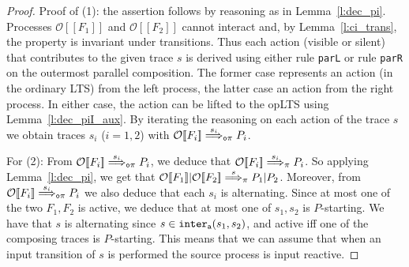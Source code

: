 \documentclass[11pt,a4paper]{amsart}
\theoremstyle{plain}
\theoremstyle{definition}
\theoremstyle{defC}
\theoremstyle{thmC}
\theoremstyle{plain}
\numberwithin{equation}{section}
\def\finish#1{\vskip.2cm\noindent{\em #1}%
  \marginpar{$\longleftarrow$}\vskip.2cm}
\newcommand{\finish}[1]{}
\newcommand{\tr}{s}
\newcommand{\trans}[1]{\mbox{{\tt #1}}}
\newcommand{\rmm}[1]{{\tt{\lowercase{#1}}}}
\newcommand{\genArr}[2]{\mathrel{\stackrel{{#1}}{\Longrightarrow}_{\rmm{\lowercase{#2}}}}}  %
\newcommand{\ArrPI}[1]{\genArr{#1}{\pi}}   %
\newcommand{\ArrN}[1]{\genArr{#1}{o\pi}}  %
\newcommand{\opLTS}{opLTS\xspace}  %
\newcommand{\interlA}[2]{{\tt inter_{a}}( #1, #2)}
\newcommand{\FF}{F}
\newcommand{\encoEnvV}[1]{{\mathcal {O}} [\! [ #1 ] \! ]  } %
\newcommand{\encoConV}{\encoEnvV} %
\newcommand{\reff}[1]{(\ref{#1})}
\newcommand{\gj}[1]{\finish{{\bf GJ:} #1}}
\newcommand{\gj}[1]{}
\theoremstyle{plain}
\theoremstyle{definition}
\begin{document}
\begin{proof}
Proof of (1): 
the assertion follows by reasoning as in Lemma~\ref{l:dec_pi}.
Processes 
$\encoConV {\FF_1}$ and  $\encoConV {\FF_2}$ cannot interact and, by
Lemma~\ref{l:ci_trans}, the property is invariant under transitions. 
Thus each action (visible
or silent) that contributes to the given trace $\tr$ is derived using either  
rule {\trans{parL}} or  rule {\trans{parR}} on the outermost parallel composition. 
The former case represents  an action (in the ordinary LTS) from the left process, the
latter case an action from the right process. In either case, the action can be lifted to 
the  \opLTS using Lemma~\ref{l:dec_piI_aux}. 
By iterating the reasoning on each action of the trace  $\tr$
we obtain traces $\tr_i$ ($i=1,2$) with  
 $\encoConV {\FF_i} \ArrN { \tr_i} P_i$. 


For (2): From $\encoConV {\FF_i} \ArrN { \tr_i} P_i$, we deduce that
$\encoConV {\FF_i} \ArrPI{ \tr_i} P_i$.
So applying Lemma~\ref{l:dec_pi}, we get that 
$\encoConV {\FF_1} |\encoConV {\FF_2} \ArrPI \tr  P_1 | P_2$.
Moreover, from $\encoConV {\FF_i} \ArrN { \tr_i} P_i$ we also deduce
that each $\tr_i$ is alternating. Since at most one of the two
$\FF_1,\FF_2$ is active, we deduce that at most one of $s_1,s_2$ 
is $P$-starting. We have that $\tr$ is alternating since
$\tr \in \interlA{ \tr_1 }{ \tr_2 }$, and 
active iff one of the composing traces is $P$-starting. This means that we can assume 
that when an input transition of $\tr$ is performed the source process is 
input reactive.
\end{proof} 
\end{document}
